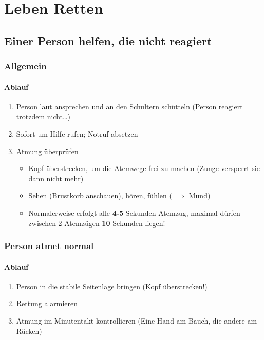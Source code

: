 \part{Leben Retten}

\chapter{Einer Person helfen, die nicht reagiert}

\section{Allgemein}
\subsection*{Ablauf}
\begin{enumerate}
    \item Person laut ansprechen und an den Schultern schütteln (Person reagiert trotzdem nicht\dots)
    \item Sofort um Hilfe rufen; Notruf absetzen
    \item Atmung überprüfen
    \begin{itemize}
        \item Kopf überstrecken, um die Atemwege frei zu machen (Zunge versperrt sie dann nicht mehr)
        \item Sehen (Brustkorb anschauen), hören, fühlen ($\implies$ Mund)
        \item Normalerweise erfolgt alle \textbf{4-5} Sekunden Atemzug, maximal dürfen zwischen 2 Atemzügen \textbf{10} Sekunden liegen!
    \end{itemize}
\end{enumerate}

\section{Person atmet normal}

\subsection*{Ablauf}
\begin{enumerate}
    \item Person in die stabile Seitenlage bringen (Kopf überstrecken!)
    \item Rettung alarmieren
    \item Atmung im Minutentakt kontrollieren (Eine Hand am Bauch, die andere am Rücken)
\end{enumerate}

